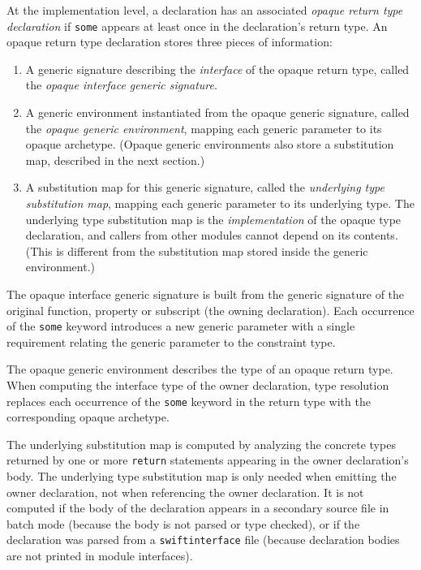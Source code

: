 \documentclass[../generics]{subfiles}
\begin{document}
At the implementation level, a declaration has an associated \emph{opaque return type declaration} if \texttt{some} appears at least once in the declaration's return type. An opaque return type declaration stores three pieces of information:
\begin{enumerate}
\item A generic signature describing the \emph{interface} of the opaque return type, called the \emph{opaque interface generic signature}.
\item A generic environment instantiated from the opaque generic signature, called the \emph{opaque generic environment}, mapping each generic parameter to its opaque archetype. (Opaque generic environments also store a substitution map, described in the next section.)
\item A substitution map for this generic signature, called the \emph{underlying type substitution map}, mapping each generic parameter to its underlying type. The underlying type substitution map is the \emph{implementation} of the opaque type declaration, and callers from other modules cannot depend on its contents. (This is different from the substitution map stored inside the generic environment.)
\end{enumerate}
The opaque interface generic signature is built from the generic signature of the original function, property or subscript (the owning declaration). Each occurrence of the \texttt{some} keyword introduces a new generic parameter with a single requirement relating the generic parameter to the constraint type.
 
The opaque generic environment describes the type of an opaque return type. When computing the interface type of the owner declaration, type resolution replaces each occurrence of the \texttt{some} keyword in the return type with the corresponding opaque archetype.

The underlying substitution map is computed by analyzing the concrete types returned by one or more \texttt{return} statements appearing in the owner declaration's body. The underlying type substitution map is only needed when emitting the owner declaration, not when referencing the owner declaration. It is not computed if the body of the declaration appears in a secondary source file in batch mode (because the body is not parsed or type checked), or if the declaration was parsed from a \texttt{swiftinterface} file (because declaration bodies are not printed in module interfaces).
\end{document}
